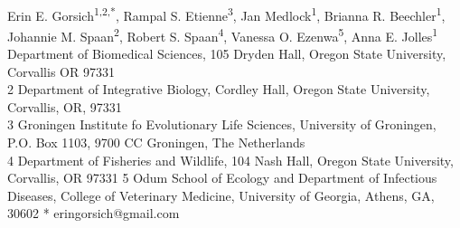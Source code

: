 \documentclass[10pt,letterpaper]{article}
\begin{document}
\vspace*{0.35in}

\begin{flushleft}
{\huge%
\textbf{}}
\newline
\\
Erin E. Gorsich\textsuperscript{1,2,*},
Rampal S. Etienne\textsuperscript{3},
Jan Medlock\textsuperscript{1},
Brianna R. Beechler\textsuperscript{1},
Johannie M. Spaan\textsuperscript{2},
Robert S. Spaan\textsuperscript{4},
Vanessa O. Ezenwa\textsuperscript{5}, 
Anna E. Jolles\textsuperscript{1} \\
 Department of Biomedical Sciences, 105 Dryden Hall, Oregon State University, Corvallis OR 97331 \\
2 Department of Integrative Biology, Cordley Hall, Oregon State University, Corvallis, OR, 97331 \\
3 Groningen Institute fo Evolutionary Life Sciences, University of Groningen, P.O. Box 1103, 9700 CC Groningen, The Netherlands \\
4 Department of Fisheries and Wildlife, 104 Nash Hall, Oregon State University, Corvallis, OR 97331
5 Odum School of Ecology and Department of Infectious Diseases, College of Veterinary Medicine, University of Georgia, Athens, GA, 30602
\bigskip
* eringorsich@gmail.com
\end{flushleft}
\end{document}
